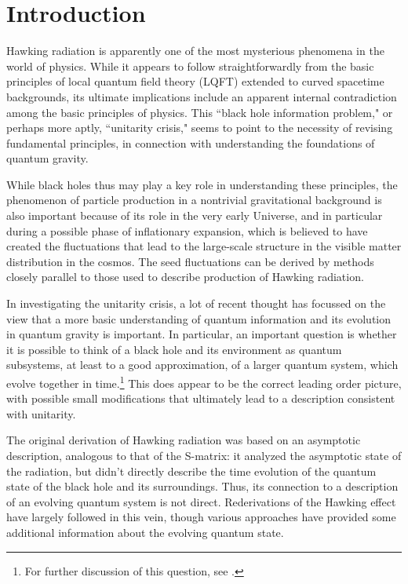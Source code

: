 \documentclass[12pt]{article}
\numberwithin{equation}{section}
\begin{document}
\section{Introduction}

Hawking radiation\cite{Hawk} is apparently one of the most mysterious phenomena in the world of physics.  While it appears to follow straightforwardly from the basic principles of local quantum field theory (LQFT) extended to curved spacetime backgrounds, its ultimate implications include an apparent internal contradiction among the basic principles of physics.  This ``black hole information problem," or perhaps more aptly, ``unitarity crisis," seems to point to the necessity of revising fundamental principles, in connection with understanding the foundations of quantum gravity.

While black holes thus may play a key role in understanding these principles, the phenomenon of particle production in a nontrivial gravitational background is also important because of its role in the very early Universe, and in particular during a possible phase of inflationary expansion, which is believed to have created the fluctuations that lead to the large-scale structure in the visible matter distribution in the cosmos.  The seed fluctuations can be derived by methods closely parallel to those used to describe production of Hawking radiation.

In investigating the unitarity crisis, a lot of recent thought has focussed on the view that a more basic understanding of quantum information and its evolution in quantum gravity is important.  In particular, an important question is whether it is possible to think of a black hole and its environment as quantum subsystems, at least to a good approximation, of a larger quantum system, which evolve together in time.\footnote{For further discussion of this question, see \cite{SGsub}.}
This does appear to be the correct leading order picture, with possible small modifications that ultimately lead to a description consistent with unitarity.  

The original derivation\cite{Hawk} of Hawking radiation was based on an asymptotic description, analogous to that of the S-matrix:  it analyzed the asymptotic state of the radiation, but didn't directly describe the time evolution of the quantum state of the black hole and its surroundings.  Thus, its connection to a description of an evolving quantum system is not direct.
Rederivations of the Hawking effect have largely followed in this vein, though various approaches have provided some additional information about the evolving quantum state.
\end{document}

